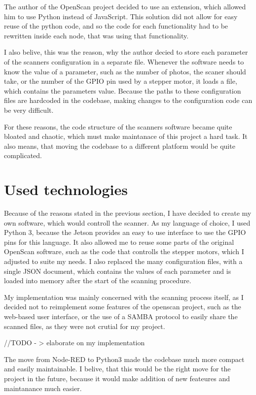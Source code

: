 The author of the OpenScan project decided to use an extension, which allowed him to use Python instead of JavaScript.
This solution did not allow for easy reuse of the python code, and so the code for each functionality had to be rewritten inside each node, that was using that functionality.

I also belive, this was the reason, why the author decied to store each parameter of the scanners configuration in a separate file.
Whenever the software needs to know the value of a parameter, such as the number of photos, the scaner should take, or the number of the GPIO pin used by a stepper motor, it loads a file, which contains the parameters value.
Because the paths to these configuration files are hardcoded in the codebase, making changes to the configuration code can be very difficult.

For these reasons, the code structure of the scanners software became quite bloated and chaotic, which must make maintanace of this project a hard task.
It also means, that moving the codebase to a different platform would be quite complicated.


\section{Used technologies}
Because of the reasons stated in the previous section, I have decided to create my own software, which would controll the scanner.
As my language of choice, I used Python 3, because the Jetson provides an easy to use interface to use the GPIO pins for this language.
It also allowed me to reuse some parts of the original OpenScan software, such as the code that controlls the stepper motors, which I adjusted to suite my needs.
I also replaced the many configuration files, with a single JSON document, which contains the values of each parameter and is loaded into memory after the start of the scanning procedure.

My implementation was mainly concerned with the scanning process itself, as I decided not to reimplement some features of the openscan project, such as the web-based user interface, or the use of a SAMBA protocol to easily share the scanned files, as they were not crutial for my project.

//TODO - > elaborate on my implementation


The move from Node-RED to Python3 made the codebase much more compact and easily maintainable.
I belive, that this would be the right move for the project in the future, because it would make addition of new feateures and maintanance much easier.






\endinput